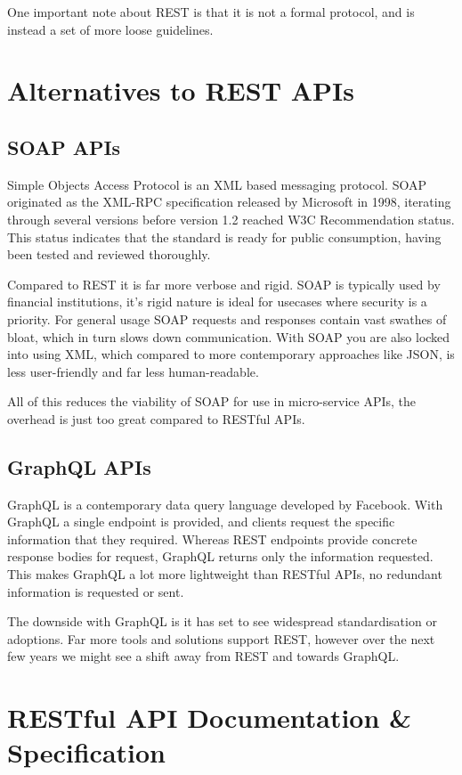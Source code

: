 One important note about REST is that it is not a formal protocol, and is instead a set of more loose guidelines. 

\section{Alternatives to REST APIs}
\subsection{SOAP APIs}
Simple Objects Access Protocol is an XML based messaging protocol. SOAP originated as the XML-RPC specification \cite{xmlrpc} released by Microsoft in 1998, iterating through several versions before version 1.2 \cite{soap1.2} reached W3C Recommendation status. This status indicates that the standard is ready for public consumption, having been tested and reviewed thoroughly.

Compared to REST it is far more verbose and rigid. SOAP is typically used by financial institutions, it's rigid nature is ideal for usecases where security is  a priority. For general usage SOAP requests and responses contain vast swathes of bloat, which in turn slows down communication. With SOAP you are also locked into using XML, which compared to more contemporary approaches like JSON, is less user-friendly and far less human-readable.

All of this reduces the viability of SOAP for use in micro-service APIs, the overhead is just too great compared to RESTful APIs.

\subsection{GraphQL APIs}
GraphQL is a contemporary data query language developed by Facebook. With GraphQL a single endpoint is provided, and clients request the specific information that they required. Whereas REST endpoints provide concrete response bodies for request, GraphQL returns only the information requested. This makes GraphQL a lot more lightweight than RESTful APIs, no redundant information is requested or sent.

The downside with GraphQL is it has set to see widespread standardisation or adoptions. Far more tools and solutions support REST, however over the next few years we might see a shift away from REST and towards GraphQL. 
\section{RESTful API Documentation \& Specification}
